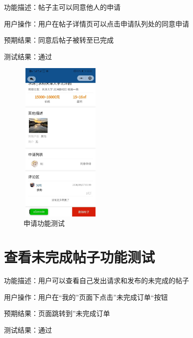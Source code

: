    功能描述：帖子主可以同意他人的申请
   
   用户操作：用户在帖子详情页可以点击申请队列处的同意申请
   
   预期结果：同意后帖子被转至已完成
   
   测试结果：通过
   
   \begin{figure}[htbp]
       \centering
       \begin{minipage}[t]{0.48\textwidth}
       \centering
       \includegraphics[width=4cm,height=8cm]{test/image/test46.png} 
    
      \caption{申请功能测试} 
             \end{minipage}
       \end{figure}
      \newpage 
   \section{查看未完成帖子功能测试}
 
   功能描述：用户可以查看自己发出请求和发布的未完成的帖子
   
   用户操作：用户在“我的”页面下点击”未完成订单“按钮
   
   预期结果：页面跳转到”未完成订单
   
   测试结果：通过
 
